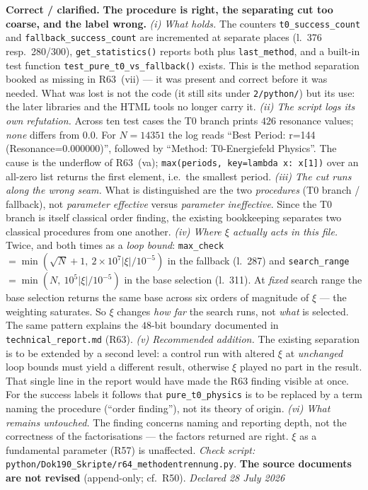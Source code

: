 \smallskip\noindent\textbf{Correct / clarified.}\quad
\textbf{The procedure is right, the separating cut too coarse, and the
label wrong.}
\emph{(i) What holds.} The counters \texttt{t0\_success\_count} and
\texttt{fallback\_success\_count} are incremented at separate places
(l.~376 resp.\ 280/300), \texttt{get\_statistics()} reports both plus
\texttt{last\_method}, and a built-in test function
\texttt{test\_pure\_t0\_vs\_fallback()} exists. This is the method
separation booked as missing in R63~(vii) --- it was present and correct
before it was needed. What was lost is not the code (it still sits under
\texttt{2/python/}) but its use: the later libraries and the HTML tools
no longer carry it.
\emph{(ii) The script logs its own refutation.} Across ten test cases the
T0 branch prints $426$ resonance values; \emph{none} differs from $0.0$.
For $N = 14351$ the log reads \enquote{Best Period: r=144
(Resonance=0.000000)}, followed by \enquote{Method: T0-Energiefeld
Physics}. The cause is the underflow of R63~(va);
\texttt{max(periods, key=lambda x: x[1])} over an all-zero list returns
the first element, i.e.\ the smallest period.
\emph{(iii) The cut runs along the wrong seam.} What is distinguished are
the two \emph{procedures} (T0 branch / fallback), not \emph{parameter
effective} versus \emph{parameter ineffective}. Since the T0 branch is
itself classical order finding, the existing bookkeeping separates two
classical procedures from one another.
\emph{(iv) Where $\xi$ actually acts in this file.} Twice, and both times
as a \emph{loop bound}: \texttt{max\_check}
$=\min(\sqrt{N}+1,\ 2\times10^{7}|\xi|/10^{-5})$ in the fallback
(l.~287) and \texttt{search\_range} $=\min(N,\ 10^{5}|\xi|/10^{-5})$ in
the base selection (l.~311). At \emph{fixed} search range the base
selection returns the same base across six orders of magnitude of $\xi$
--- the weighting saturates. So $\xi$ changes \emph{how far} the search
runs, not \emph{what} is selected. The same pattern explains the $48$-bit
boundary documented in \texttt{technical\_report.md} (R63).
\emph{(v) Recommended addition.} The existing separation is to be
extended by a second level: a control run with altered $\xi$ at
\emph{unchanged} loop bounds must yield a different result, otherwise
$\xi$ played no part in the result. That single line in the report would
have made the R63 finding visible at once. For the success labels it
follows that \texttt{pure\_t0\_physics} is to be replaced by a term
naming the procedure (\enquote{order finding}), not its theory of origin.
\emph{(vi) What remains untouched.} The finding concerns naming and
reporting depth, not the correctness of the factorisations --- the
factors returned are right. $\xi$ as a fundamental parameter (R57) is
unaffected.
\emph{Check script:}
\texttt{python/\allowbreak Dok190\_\allowbreak Skripte/\allowbreak r64\_\allowbreak methodentrennung.py}.
\textbf{The source documents are not revised}
(append-only; cf.\ R50). \emph{Declared 28 July 2026}

